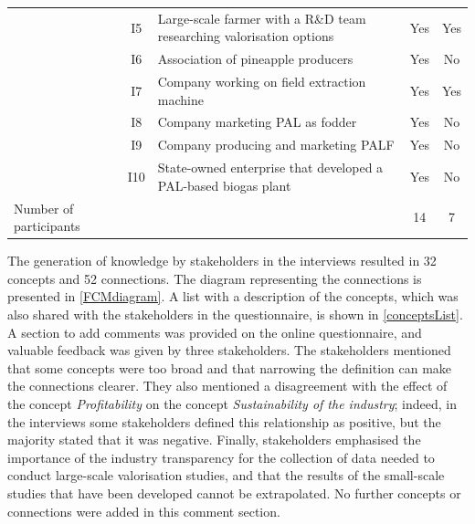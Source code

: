 \begin{table}[ht]
{\begin{threeparttable}
\begin{tabular}{lcp{}cc}
                           & I5  & Large-scale farmer with a R\&D team researching valorisation options                             &    Yes                   & Yes \\
                           & I6  & Association of pineapple producers                                                               &      Yes                 & No  \\
                           & I7  & Company working on field extraction machine                                                      &     Yes                  & Yes \\
                           & I8  & Company marketing PAL as fodder                                                                  &      Yes                 & No  \\
                           & I9  & Company producing and marketing PALF                                                             &     Yes                  & No  \\
                           & I10 & State-owned enterprise that developed a PAL-based biogas plant                                                               &  Yes                     & No  \\ \cline{1-5} 
Number of participants  & & &  14 & 7 \\ \hline \hline
\end{tabular}
\end{threeparttable}%
}
\end{table}


The generation of knowledge by stakeholders in the interviews resulted in 32 concepts and 52 connections. The diagram representing the connections is presented in \cref{FCMdiagram}. A list with a description of the concepts, which was also shared with the stakeholders in the questionnaire, is shown in \cref{conceptsList}. A section to add comments was provided on the online questionnaire, and valuable feedback was given by three stakeholders. The stakeholders mentioned that some concepts were too broad and that narrowing the definition can make the connections clearer. They also mentioned a disagreement with the effect of the concept \textit{Profitability} on the concept \textit{Sustainability of the industry}; indeed, in the interviews some stakeholders defined this relationship as positive, but the majority stated that it was negative. Finally, stakeholders emphasised the importance of the industry transparency for the collection of data needed to conduct large-scale valorisation studies, and that the results of the small-scale studies that have been developed cannot be extrapolated. No further concepts or connections were added in this comment section. 

